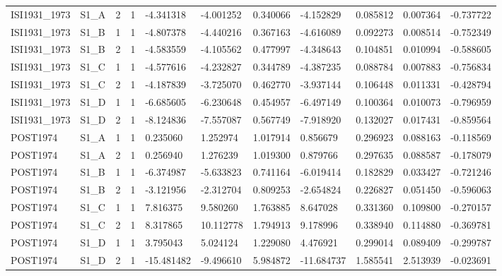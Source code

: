 \begin{tabular}{lllllllllll}
ISI1931\_1973 & S1\_A & 2 & 1 & -4.341318 & -4.001252 & 0.340066 & -4.152829 & 0.085812 & 0.007364 & -0.737722 \\
ISI1931\_1973 & S1\_B & 1 & 1 & -4.807378 & -4.440216 & 0.367163 & -4.616089 & 0.092273 & 0.008514 & -0.752349 \\
ISI1931\_1973 & S1\_B & 2 & 1 & -4.583559 & -4.105562 & 0.477997 & -4.348643 & 0.104851 & 0.010994 & -0.588605 \\
ISI1931\_1973 & S1\_C & 1 & 1 & -4.577616 & -4.232827 & 0.344789 & -4.387235 & 0.088784 & 0.007883 & -0.756834 \\
ISI1931\_1973 & S1\_C & 2 & 1 & -4.187839 & -3.725070 & 0.462770 & -3.937144 & 0.106448 & 0.011331 & -0.428794 \\
ISI1931\_1973 & S1\_D & 1 & 1 & -6.685605 & -6.230648 & 0.454957 & -6.497149 & 0.100364 & 0.010073 & -0.796959 \\
ISI1931\_1973 & S1\_D & 2 & 1 & -8.124836 & -7.557087 & 0.567749 & -7.918920 & 0.132027 & 0.017431 & -0.859564 \\
POST1974 & S1\_A & 1 & 1 & 0.235060 & 1.252974 & 1.017914 & 0.856679 & 0.296923 & 0.088163 & -0.118569 \\
POST1974 & S1\_A & 2 & 1 & 0.256940 & 1.276239 & 1.019300 & 0.879766 & 0.297635 & 0.088587 & -0.178079 \\
POST1974 & S1\_B & 1 & 1 & -6.374987 & -5.633823 & 0.741164 & -6.019414 & 0.182829 & 0.033427 & -0.721246 \\
POST1974 & S1\_B & 2 & 1 & -3.121956 & -2.312704 & 0.809253 & -2.654824 & 0.226827 & 0.051450 & -0.596063 \\
POST1974 & S1\_C & 1 & 1 & 7.816375 & 9.580260 & 1.763885 & 8.647028 & 0.331360 & 0.109800 & -0.270157 \\
POST1974 & S1\_C & 2 & 1 & 8.317865 & 10.112778 & 1.794913 & 9.178996 & 0.338940 & 0.114880 & -0.369781 \\
POST1974 & S1\_D & 1 & 1 & 3.795043 & 5.024124 & 1.229080 & 4.476921 & 0.299014 & 0.089409 & -0.299787 \\
POST1974 & S1\_D & 2 & 1 & -15.481482 & -9.496610 & 5.984872 & -11.684737 & 1.585541 & 2.513939 & -0.023691 \\
\hline
\end{tabular}
